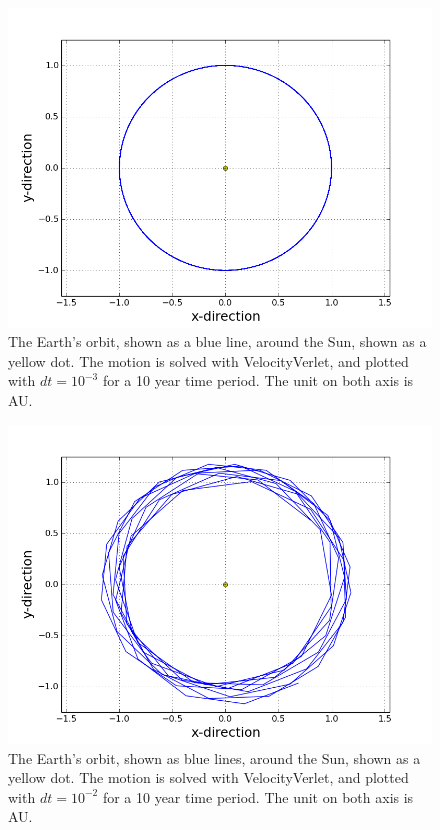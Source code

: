 \documentclass[norsk,a4paper,12pt]{article}
\begin{document}
{\begin{figure} [H]
    \centering
    \includegraphics[scale=0.6]{oppg_3c_sun_earth_verlet_dt=10(-3)}
    \caption{The Earth's orbit, shown as a blue line, around the Sun, shown as a yellow dot. The motion is solved with VelocityVerlet, and plotted with $dt = 10^{-3}$ for a 10 year time period. The unit on both axis is AU.}
    \label{fig:EarthOrbit_Verlet_det = 10(-3)}
\end{figure}

\begin{figure} [H]
    \centering
    \includegraphics[scale=0.6]{oppg_3c_sun_earth_verlet_dt=10(-1)}
    \caption{The Earth's orbit, shown as blue lines, around the Sun, shown as a yellow dot. The motion is solved with VelocityVerlet, and plotted with $dt = 10^{-2}$ for a 10 year time period. The unit on both axis is AU.}
    \label{fig:EarthOrbit_Verlet_det = 10(-1)}
\end{figure}

}
\end{document}
